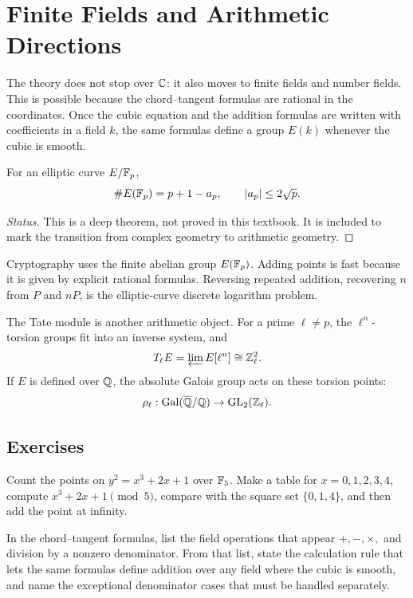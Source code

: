 \chapter{Finite Fields and Arithmetic Directions}
\label{ch:finite-fields}

The theory does not stop over \(\mathbb{C}\): it also moves to finite fields and number
fields.  This is possible because the chord--tangent formulas are rational in
the coordinates.  Once the cubic equation and the addition formulas are written
with coefficients in a field \(k\), the same formulas define a group \(E(k)\)
whenever the cubic is smooth.

\begin{theorem}
\label{thm:hasse}
For an elliptic curve \(E/\mathbb{F}_p\),
\[
  \#E(\mathbb{F}_p)=p+1-a_p,\qquad |a_p|\le 2\sqrt p.
\]
\end{theorem}

\begin{proof}[Status]
This is a deep theorem, not proved in this textbook.  It is included to mark the
transition from complex geometry to arithmetic geometry.
\end{proof}

Cryptography uses the finite abelian group \(E(\mathbb{F}_p)\).  Adding points is fast
because it is given by explicit rational formulas.  Reversing repeated addition,
recovering \(n\) from \(P\) and \(nP\), is the elliptic-curve discrete logarithm
problem.

The Tate module is another arithmetic object.  For a prime \(\ell\ne p\), the
\(\ell^n\)-torsion groups fit into an inverse system, and
\[
  T_\ell E=\varprojlim E[\ell^n]\cong \mathbb{Z}_\ell^2.
\]
If \(E\) is defined over \(\mathbb{Q}\), the absolute Galois group acts on these torsion
points:
\[
  \rho_\ell:\operatorname{Gal}(\overline{\mathbb{Q}}/\mathbb{Q})\to \operatorname{GL}_2(\mathbb{Z}_\ell).
\]

\section*{Exercises}

\begin{exercise}
Count the points on \(y^2=x^3+2x+1\) over \(\mathbb{F}_5\).  Make a table for
\(x=0,1,2,3,4\), compute \(x^3+2x+1\pmod 5\), compare with the square set
\(\{0,1,4\}\), and then add the point at infinity.
\end{exercise}

\begin{exercise}
In the chord--tangent formulas, list the field operations that appear
\(+, -, \times,\) and division by a nonzero denominator.  From that list, state
the calculation rule that lets the same formulas define addition over any field
where the cubic is smooth, and name the exceptional denominator cases that must
be handled separately.
\end{exercise}

